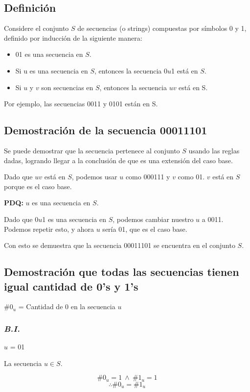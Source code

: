 \documentclass[../doc.tex]{subfiles}
\begin{document}
\subsection{Definición}
Considere el conjunto \(S\) de secuencias (o strings) compuestas por símbolos 0 y 1, definido por inducción de la siguiente manera:
\begin{itemize}
\item 01 es una secuencia en \(S\).
\item Si u es una secuencia en \(S\), entonces la secuencia 0\(u\)1 está en \(S\).
\item Si \(u\) y \(v\) son secuencias en \(S\), entonces la secuencia \(uv\) está en S.
\end{itemize}

\noindent Por ejemplo, las secuencias 0011 y 0101 están en S.

\subsection{Demostración de la secuencia 00011101}
Se puede demostrar que la secuencia pertenece al conjunto \(S\) usando las reglas dadas, logrando llegar a la conclusión de que es una extensión del caso base.

\noindent Dado que \(uv\) está en \(S\), podemos usar \(u\) como 000111 y \(v\) como 01. \(v\) está en \(S\) porque es el caso base.

\textbf{PDQ:} \(u\) es una secuencia en \(S\).

\noindent Dado que 0\(u\)1 es una secuencia en \(S\), podemos cambiar nuestro \(u\) a 0011. Podemos repetir esto, y ahora \(u\) sería 01, que es el caso base.

\noindent Con esto se demuestra que la secuencia 00011101 se encuentra en el conjunto \(S\).

\subsection{Demostración que todas las secuencias tienen igual cantidad de 0's y 1's}
\(\#0_u\) = Cantidad de 0 en la secuencia \(u\)

\subsubsection*{\emph{B.I.}}
\(u\) = 01

\noindent La secuencia \(u \in S\).

\[\#0_u = 1\ \land\ \#1_u = 1\]
\[\therefore \#0_u = \#1_u\]
\end{document}
